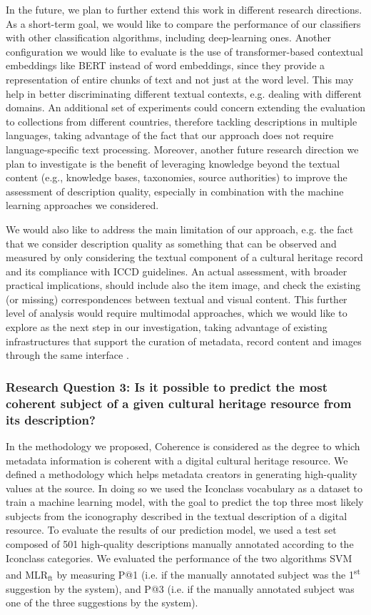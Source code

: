 \documentclass[epsfig,a4paper,12pt,titlepage]{book}
\newcommand{\mlr}{MLR$_\text{ft}$\xspace}
\begin{document}
In the future, we plan to further extend this work in different research directions. As a short-term goal, we would like to compare the performance of our classifiers with other classification algorithms, including deep-learn\-ing ones. Another configuration we would like to evaluate is the use of transformer-based contextual embeddings like BERT \cite{devlin2019bert} instead of word embeddings, since they provide a representation of entire chunks of text and not just at the word level. This may help in better discriminating different textual contexts, e.g. dealing with different domains. 
An additional set of experiments could concern extending the evaluation to collections from different countries, therefore tackling descriptions in multiple languages, taking advantage of the fact that our approach does not require language-specific text processing. Moreover, another future research direction we plan to investigate is the benefit of leveraging knowledge beyond the textual content (e.g., knowledge bases, taxonomies, source authorities) to improve the assessment of description quality, especially in combination with the machine learning approaches we considered.

We would also like to address the main limitation of our approach, e.g. the fact that we consider description quality as something that can be observed and measured by only considering the textual component of a cultural heritage record and its compliance with ICCD guidelines. An actual assessment, with broader practical implications, should include also the item image, and check the existing (or missing) correspondences between textual and visual content. This further level of analysis would require multimodal approaches, which we would like to explore as the next step in our investigation, taking advantage of existing infrastructures that support the curation of metadata, record content and images through the same interface \cite{dragoni2017knowledge}.

\subsubsection{\textbf{Research Question 3:}  Is it possible to predict the most coherent subject of a given cultural heritage resource from its description?}

In the methodology we proposed, Coherence is considered as the degree to which metadata information is coherent with a digital cultural heritage resource.  We defined a methodology which helps metadata creators in generating high-quality values at the source. In doing so we used the Iconclass vocabulary as a dataset to train a machine learning model, with the goal to predict the top three most likely subjects from the iconography described in the textual description of a digital resource. 
To evaluate the results of our prediction model, we used a test set composed of 501 high-quality descriptions manually annotated according to the Iconclass categories. We evaluated the performance of the two algorithms SVM and \mlr by measuring   P@1 (i.e. if the manually annotated subject was the 1\textsuperscript{st} suggestion by the system), and P@3 (i.e. if the manually annotated subject was one of the three suggestions by the system). 
\end{document}
